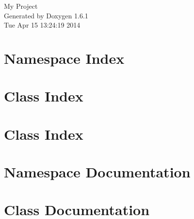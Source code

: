 \documentclass[a4paper]{book}
\begin{document}
\hypersetup{pageanchor=false}
\begin{titlepage}
\vspace*{7cm}
\begin{center}
{\Large My Project }\\
\vspace*{1cm}
{\large Generated by Doxygen 1.6.1}\\
\vspace*{0.5cm}
{\small Tue Apr 15 13:24:19 2014}\\
\end{center}
\end{titlepage}
\clearemptydoublepage
{}
\tableofcontents
\clearemptydoublepage
{}
\hypersetup{pageanchor=true}
\chapter{Namespace Index}

\chapter{Class Index}

\chapter{Class Index}

\chapter{Namespace Documentation}


\chapter{Class Documentation}


































\printindex
\end{document}
